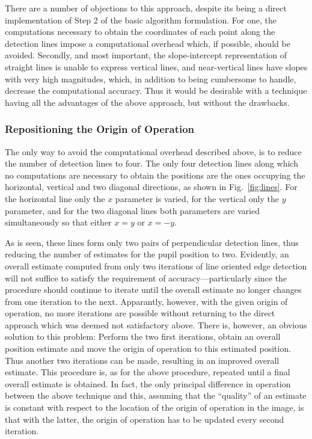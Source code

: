 There are a number of objections to this approach, despite its being a
direct implementation of Step 2 of the basic algorithm formulation.
For one, the computations necessary to obtain the coordinates of each
point along the detection lines impose a computational overhead which,
if possible, should be avoided.  Secondly, and most important, the
slope-intercept representation of straight lines is unable to express
vertical lines, and near-vertical lines have slopes with very high
magnitudes, which, in addition to being cumbersome to handle, decrease
the computational accuracy.  Thus it would be desirable with a
technique having all the advantages of the above approach, but without
the drawbacks.

\subsubsection{Repositioning the Origin of Operation}


The only way to avoid the computational overhead described above, is
to reduce the number of detection lines to four.  The only four
detection lines along which no computations are necessary to obtain
the positions are the ones occupying the horizontal, vertical and two
diagonal directions, as shown in Fig.~\ref{fig:lines}.  For the
horizontal line only the $x$ parameter is varied, for the vertical
only the $y$ parameter, and for the two diagonal lines both parameters
are varied simultaneously so that either $x=y$ or $x=-y$.  

As is seen, these lines form only two pairs of perpendicular detection
lines, thus reducing the number of estimates for the pupil position to
two.  Evidently, an overall estimate computed from only two iterations
of line oriented edge detection will not suffice to satisfy the
requirement of accuracy---particularly since the procedure should
continue to iterate until the overall estimate no longer changes from
one iteration to the next.  Apparantly, however, with the given origin
of operation, no more iterations are possible without returning to the
direct approach which was deemed not satisfactory above.  There is,
however, an obvious solution to this problem: Perform the two first
iterations, obtain an overall position estimate and move the origin of
operation to this estimated position.  Thus another two iterations can
be made, resulting in an improved overall estimate.  This procedure
is, as for the above procedure, repeated until a final overall
estimate is obtained.  In fact, the only principal difference in
operation between the above technique and this, assuming that the
``quality'' of an estimate is constant with respect to the location of
the origin of operation in the image, is that with the latter, the
origin of operation has to be updated every second iteration.

